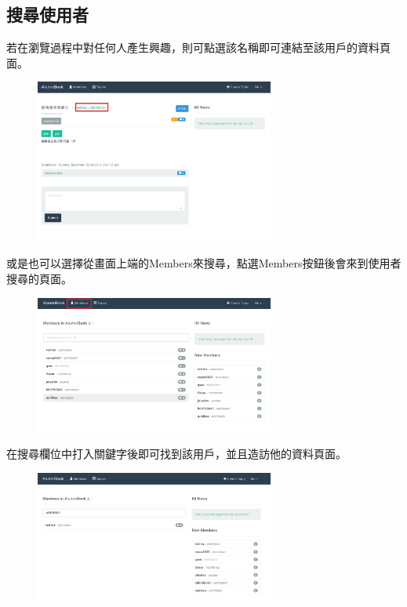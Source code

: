 \documentclass[12pt]{article}
\begin{document}
\subsection{搜尋使用者}
若在瀏覽過程中對任何人產生興趣，則可點選該名稱即可連結至該用戶的資料頁面。
\begin{figure}[H]
\centering\includegraphics[width=0.7\textwidth]{img/user01.png}
\end{figure}
或是也可以選擇從畫面上端的Members來搜尋，點選Members按鈕後會來到使用者搜尋的頁面。
\begin{figure}[H]
\centering\includegraphics[width=0.7\textwidth]{img/user02.png}
\end{figure}
在搜尋欄位中打入關鍵字後即可找到該用戶，並且造訪他的資料頁面。
\begin{figure}[H]
\centering\includegraphics[width=0.7\textwidth]{img/user03.png}
\end{figure}
\end{document}
